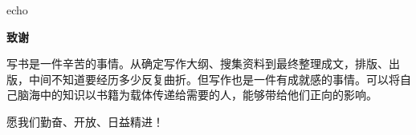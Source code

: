 echo\backmatter
\printindex
\newpage
\thispagestyle{empty}

\begin{center}  %
     \Large\bfseries 致谢\\[1cm]  %
\end{center}

写书是一件辛苦的事情。从确定写作大纲、搜集资料到最终整理成文，排版、出版，中间不知道要经历多少反复曲折。但写作也是一件有成就感的事情。可以将自己脑海中的知识以书籍为载体传递给需要的人，能够带给他们正向的影响。
\par  %
愿我们勤奋、开放、日益精进！
